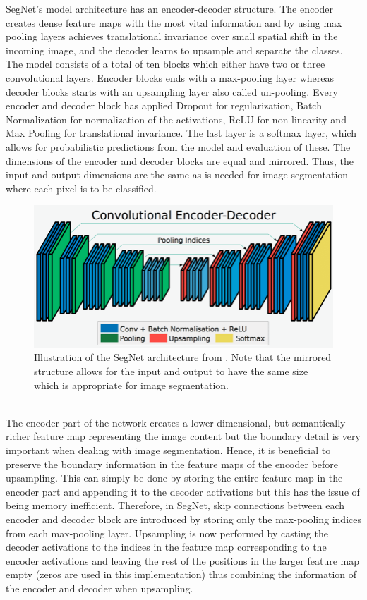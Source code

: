 \documentclass{article}
\begin{document}
SegNet's model architecture has an encoder-decoder structure. The encoder creates dense feature maps with the most vital information and by using max pooling layers achieves translational invariance over small spatial shift in the incoming image, and the decoder learns to upsample and separate the classes.
The model consists of a total of ten blocks which either have two or three convolutional layers. Encoder blocks ends with a max-pooling layer whereas decoder blocks starts with an upsampling layer also called  un-pooling.
Every encoder and decoder block has applied Dropout for regularization, Batch Normalization for normalization of the activations, ReLU for non-linearity and Max Pooling for translational invariance.
The last layer is a softmax layer, which allows for probabilistic predictions from the model and evaluation of these. The dimensions of the encoder and decoder blocks are equal and mirrored. Thus, the input and output dimensions are the same as is needed for image segmentation where each pixel is to be classified.
\begin{figure}[!h]
	\centering
	\includegraphics[width=0.8\linewidth]{../../poster/Encoder-Decoder2}
	\caption{Illustration of the SegNet architecture from \cite{seg}. Note that the mirrored structure allows for the input and output to have the same size which is appropriate for image segmentation.}
	\label{fig:encoder-decoder2}
\end{figure}
\\
The encoder part of the network creates a lower dimensional, but semantically richer feature map representing the image content but the boundary detail is very important when dealing with image segmentation.
Hence, it is beneficial to preserve the boundary information in the feature maps of the encoder before upsampling.
This can simply be done by storing the entire feature map in the encoder part and appending it to the decoder activations but this has the issue of being memory inefficient. 
Therefore, in SegNet, skip connections between each encoder and decoder block are introduced by storing only the max-pooling indices from each max-pooling layer. 
Upsampling is now performed by casting the decoder activations to the indices in the feature map corresponding to the encoder activations and leaving the rest of the positions in the larger feature map empty (zeros are used in this implementation) thus combining the information of the encoder and decoder when upsampling.
\end{document}
